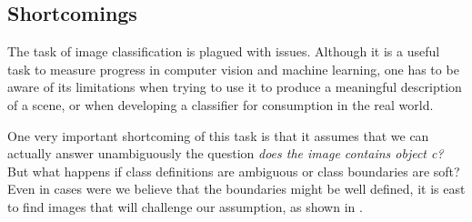 


\subsection{Shortcomings}

The task of image classification is plagued with issues. Although it is a useful task to measure progress in computer vision and machine learning, one has to be aware of its limitations when trying to use it to produce a meaningful description of a scene, or when developing a classifier for consumption in the real world.  

One very important shortcoming of this task is that it assumes that we can actually answer unambiguously the question {\em does the image contains object c?} But what happens if class definitions are ambiguous or class boundaries are soft? Even in cases were we believe that the boundaries might be well defined, it is east to find images that will challenge our assumption, as shown in \fig{\ref{fig:whatisacar}}.

